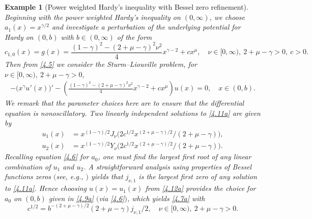 \documentclass[reqno,10pt,centertags]{amsart}
\newcommand{\g}{\gamma}
\numberwithin{equation}{section}
\newtheorem{example}[theorem]{Example}
\theoremstyle{remark}
\begin{document}
\begin{example}[Power weighted Hardy's inequality with Bessel zero refinement]
Beginning with the power weighted Hardy's inequality on $(0,\infty)$, we choose $a_1(x)=x^{\g/2}$ and investigate a perturbation of the underlying potential for Hardy on $(0,b)$ with $b\in(0,\infty)$ of the form
\begin{equation}
c_{1,0}(x)=g(x)=\frac{(1-\g)^2-(2+\mu-\g)^2\nu^2}{4}x^{\g-2}+c x^\mu,\quad \nu\in[0,\infty),\ 2+\mu-\g>0,\ c>0.
\end{equation}
Then from \eqref{4.5} we consider the Sturm--Liouville problem, for $\nu\in[0,\infty),\ 2+\mu-\g>0$,
\begin{align}\label{4.11a}
-\big(x^\g u'(x)\big)'-\left(\frac{(1-\g)^2-(2+\mu-\g)^2\nu^2}{4}x^{\g-2}+c x^\mu\right)u(x)=0,\quad x\in(0,b).
\end{align}
We remark that the parameter choices here are to ensure that the differential equation is nonoscillatory.
Two linearly independent solutions to \eqref{4.11a} are given by
\begin{align}\label{4.12a}
u_1(x)&=x^{(1-\g)/2} J_\nu\big(2c^{1/2}x^{(2+\mu-\g)/2}/(2+\mu-\g)\big),\\
u_2(x)&=x^{(1-\g)/2} Y_\nu\big(2c^{1/2}x^{(2+\mu-\g)/2}/(2+\mu-\g)\big).
\end{align}
Recalling equation \eqref{4.6} for $a_0$, one must find the largest first root of any linear combination of $u_1$ and $u_2$. A straightforward analysis using properties of Bessel functions zeros $($see, e.g., \cite[Eqs. 10.21.2 and 10.21.3]{DLMF}$)$ yields that $j_{\nu,1}$ is the largest first zero of any solution to \eqref{4.11a}. Hence choosing $u(x)=u_1(x)$ from \eqref{4.12a} provides the choice for $a_0$ on $(0,b)$ given in \eqref{4.9a} $($via \eqref{4.6}$)$, which yields \eqref{4.7a} with
\begin{equation}
c^{1/2}=b^{-(2+\mu-\g)/2}(2+\mu-\g)j_{\nu,1}/2,\quad \nu\in[0,\infty),\ 2+\mu-\g>0.
\end{equation}
\end{example}
\end{document}
